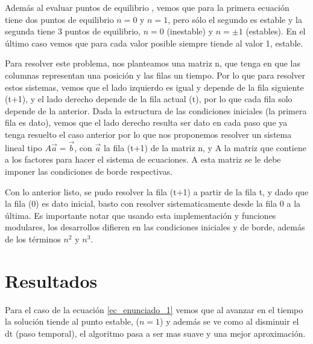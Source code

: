 \documentclass[10pt]{article}
\begin{document}
 Además al evaluar puntos de equilibrio , vemos que para la primera ecuación tiene dos puntos de equilibrio $n = 0$ y $n = 1$, pero sólo el segundo es estable y la segunda tiene 3 puntos de equilibrio, $n = 0$ (inestable) y $n = \pm1$ (estables). En el último caso vemos que para cada valor posible siempre tiende al valor 1, estable.
 
Para resolver este problema, nos planteamos una matriz n, que tenga en que las columnas representan una posición y las filas un tiempo. Por lo que para resolver estos sistemas, vemos que el lado izquierdo es igual y depende de la fila siguiente (t+1), y el lado derecho depende de la fila actual (t), por lo que cada fila solo depende de la anterior. Dada la estructura de las condiciones iniciales (la primera fila es dato), vemos que el lado derecho resulta ser dato en cada paso que ya tenga resuelto el caso anterior por lo que nos proponemos resolver un sistema lineal tipo $ A\vec{a} = \vec{b} $, con $\vec{a}$ la fila (t+1) de la matriz n, y A la matriz que contiene a los factores para hacer el sistema de ecuaciones. A esta matriz se le debe imponer las condiciones de borde respectivas.

 Con lo anterior listo, se pudo resolver la fila (t+1) a partir de la fila t, y dado que la fila (0) es dato inicial, basto con resolver sistematicamente desde la fila 0 a la última. Es importante notar que usando esta implementación y funciones modulares, los desarrollos difieren en las condiciones iniciales y de borde, además de los términos $n^2$ y $n^3$. 

\section{Resultados}
Para el caso de la ecuación \ref{ec_enunciado_1} vemos que al avanzar en el tiempo la solución tiende al punto estable, ($n = 1$) y además se ve como al disminuir el dt (paso temporal), el algoritmo pasa a ser mas suave y una mejor aproximación.
\end{document}
